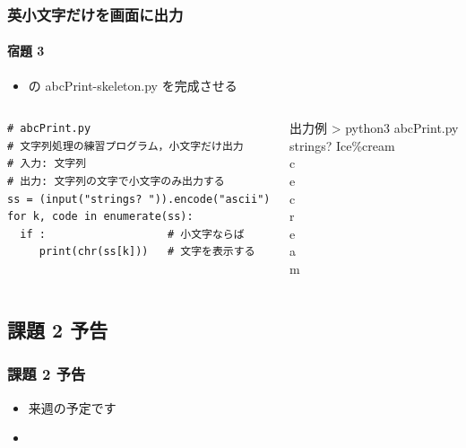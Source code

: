 \begin{frame}
\frametitle{英小文字だけを画面に出力}
\framesubtitle{宿題 3}
  \begin{itemize}
\item \href{https://sites.google.com/a/presystems.xyz/sample/home/elementary-computer-science}{} の abcPrint-skeleton.py を完成させる
  \end{itemize}
  \begin{columns}
    \begin{column}{0.6\textwidth}
      \begin{lstlisting}[caption={abcPrint.py},label=lst:lowerletterprt]
# abcPrint.py
# 文字列処理の練習プログラム，小文字だけ出力
# 入力: 文字列
# 出力: 文字列の文字で小文字のみ出力する
ss = (input("strings? ")).encode("ascii")
for k, code in enumerate(ss):
  if :                   # 小文字ならば
     print(chr(ss[k]))   # 文字を表示する
      \end{lstlisting}
    \end{column}
    \begin{column}{0.35\textwidth}
      \begin{itembox}{出力例}
\scriptsize
> python3 abcPrint.py\\
strings? Ice\%cream\\
c\\
e\\
c\\
r\\
e\\
a\\
m
      \end{itembox}
    \end{column}
  \end{columns}
\end{frame}
%
%
\subsection{課題 2 予告}
\begin{frame}
\frametitle{課題 2 予告}
  \begin{itemize}
\item 来週の予定です
\item \hyperlink{quiz2}{}
  \end{itemize}
\end{frame}
